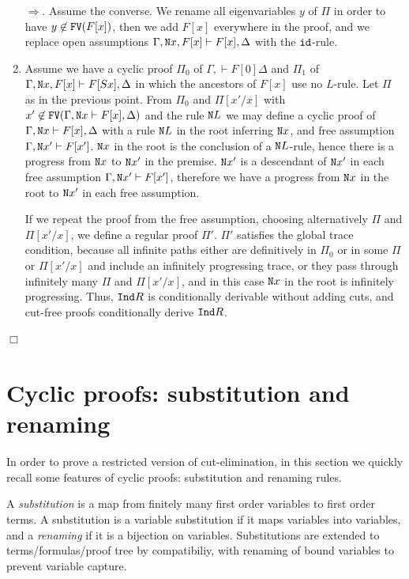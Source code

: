 \documentclass[a4paper,12pt]{article}
\newenvironment{proof}[1][Proof]{\begin{trivlist}
\item[\hskip \labelsep {\bfseries #1}]}{\end{trivlist}}
\newcommand{\Nat}               { {\tt N}  }
\newcommand{\FV}              { {\tt FV} }
\newcommand{\id}              { {\tt id} }
\newcommand{\Ind}            { {\tt Ind} }
\begin{document}
\begin{proof}
\begin{enumerate}
$\Rightarrow$. Assume the converse. We rename all eigenvariables $y$ of $\Pi$ in order to have $y \not \in \FV(F[x])$, then we add $F[x]$ everywhere in the proof, and we replace open assumptions $\Gamma, \Nat x, F[x] \vdash F[x], \Delta$ with the $\id$-rule. 

\item
Assume we have a cyclic proof $\Pi_0$ of $\Gamma, \vdash F[0] \Delta$ and $\Pi_1$ of  $\Gamma, \Nat x, F[x] \vdash F[Sx], \Delta$ in which the ancestors of $F[x]$ use no $L$-rule. Let $\Pi$ as in the previous point. From $\Pi_0$ and $\Pi[x'/x]$ with $x' \not \in \FV(\Gamma, \Nat x \vdash F[x], \Delta)$ and the rule $\Nat L$ we may define a cyclic proof of $\Gamma, \Nat x \vdash F[x], \Delta$ with a rule $\Nat L$ in the root inferring $\Nat x$, and free assumption $\Gamma, \Nat x' \vdash F[x']$. 
$\Nat x$ in the root is the conclusion of a $\Nat L$-rule, hence there is a progress from $\Nat x$ to $\Nat x'$ in the premise. $\Nat x'$ is a descendant of $\Nat x'$ in each free assumption $\Gamma, \Nat x' \vdash F[x']$, therefore we have a progress from $\Nat x$ in the root to $\Nat x'$ in each free assumption. 

If we repeat the proof from the free assumption, choosing alternatively $\Pi$ and $\Pi[x'/x]$, we define a regular proof $\Pi'$. $\Pi'$ satisfies the global trace condition, because all infinite paths either are definitively in $\Pi_0$ or in some $\Pi$ or $\Pi[x'/x]$ and include an infinitely progressing trace, or they pass through infinitely many $\Pi$ and $\Pi[x'/x]$, and in this case $\Nat x$ in the root is infinitely progressing. Thus, $\Ind R$ is conditionally derivable without adding cuts, and cut-free proofs conditionally derive $\Ind R$.
\end{enumerate}
$\Box$ \end{proof}
 
 
\section{Cyclic proofs: substitution and renaming}
In order to prove a restricted version of cut-elimination, in this section we quickly recall some features of cyclic proofs: substitution and renaming rules.

A \emph{substitution} is a map from finitely many first order variables to first order terms. A substitution is a variable substitution if it maps variables into variables, and a \emph{renaming} if it is a bijection on variables. Substitutions are extended to terms/formulas/proof tree by compatibiliy, with renaming of bound variables to prevent variable capture. 
\end{document}
